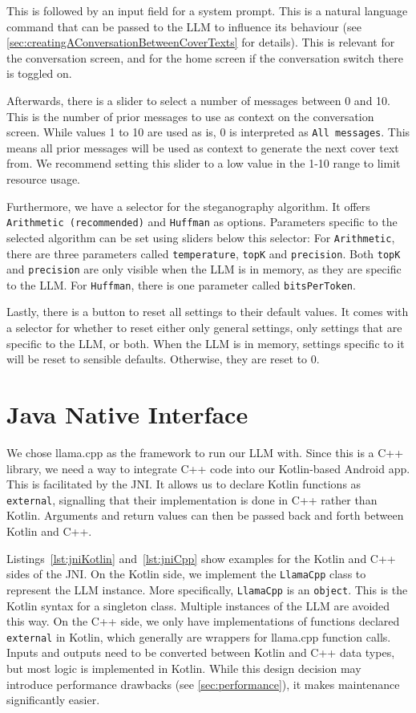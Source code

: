 This is followed by an input field for a system prompt. This is a natural language command that can be passed to the \gls{LLM} to influence its behaviour (see \cref{sec:creatingAConversationBetweenCoverTexts} for details). This is relevant for the conversation screen, and for the home screen if the conversation switch there is toggled on.

Afterwards, there is a slider to select a number of messages between 0 and 10. This is the number of prior messages to use as context on the conversation screen. While values 1 to 10 are used as is, 0 is interpreted as \lstinline|All messages|. This means all prior messages will be used as context to generate the next cover text from. We recommend setting this slider to a low value in the 1-10 range to limit resource usage.

Furthermore, we have a selector for the steganography algorithm. It offers \lstinline|Arithmetic (recommended)| and \lstinline|Huffman| as options. Parameters specific to the selected algorithm can be set using sliders below this selector: For \lstinline|Arithmetic|, there are three parameters called \lstinline|temperature|, \lstinline|topK| and \lstinline|precision|. Both \lstinline|topK| and \lstinline|precision| are only visible when the \gls{LLM} is in memory, as they are specific to the \gls{LLM}. For \lstinline|Huffman|, there is one parameter called \lstinline|bitsPerToken|.

Lastly, there is a button to reset all settings to their default values. It comes with a selector for whether to reset either only general settings, only settings that are specific to the \gls{LLM}, or both. When the \gls{LLM} is in memory, settings specific to it will be reset to sensible defaults. Otherwise, they are reset to 0.

\section{Java Native Interface}
\label{sec:javaNativeInterface}
We chose llama.cpp as the framework to run our \gls{LLM} with. Since this is a C++ library, we need a way to integrate C++ code into our Kotlin-based Android app. This is facilitated by the \gls{JNI}. It allows us to declare Kotlin functions as \lstinline|external|, signalling that their implementation is done in C++ rather than Kotlin. Arguments and return values can then be passed back and forth between Kotlin and C++.

Listings~\ref{lst:jniKotlin} and~\ref{lst:jniCpp} show examples for the Kotlin and C++ sides of the \gls{JNI}. On the Kotlin side, we implement the \lstinline|LlamaCpp| class to represent the \gls{LLM} instance. More specifically, \lstinline|LlamaCpp| is an \lstinline|object|. This is the Kotlin syntax for a singleton class. Multiple instances of the \gls{LLM} are avoided this way. On the C++ side, we only have implementations of functions declared \lstinline|external| in Kotlin, which generally are wrappers for llama.cpp function calls. Inputs and outputs need to be converted between Kotlin and C++ data types, but most logic is implemented in Kotlin. While this design decision may introduce performance drawbacks (see \cref{sec:performance}), it makes maintenance significantly easier.

